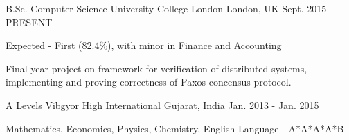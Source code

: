 

\begin{cventries}

  \cventry
    {B.Sc. Computer Science}
    {University College London}
    {London, UK}
    {Sept. 2015 - PRESENT}
    {
      \begin{cvitems}
        \item {Expected - First (82.4\%), with minor in Finance and Accounting}
        \item {Final year project on framework for verification of distributed systems, implementing and proving correctness of Paxos concensus protocol.}
      \end{cvitems}
    }

  \cventry
    {A Levels}
    {Vibgyor High International}
    {Gujarat, India}
    {Jan. 2013 - Jan. 2015}
    {
      \begin{cvitems}
        \item {Mathematics, Economics, Physics, Chemistry, English Language - A*A*A*A*B}
      \end{cvitems}
    }
\end{cventries}
